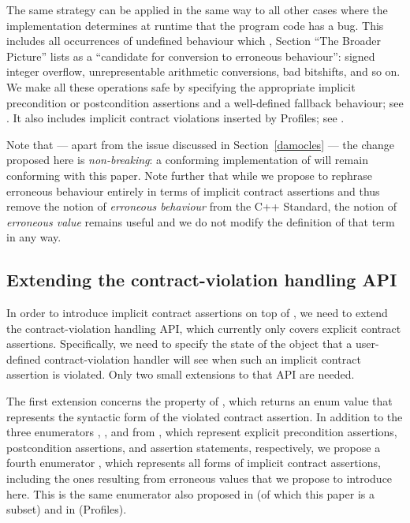 The same strategy can be applied in the same way to all other cases where the implementation determines at runtime that the program code has a bug. This includes all occurrences of undefined behaviour which \cite{P2795R5}, Section ``The Broader Picture'' lists as a ``candidate for conversion to erroneous behaviour'': signed integer overflow, unrepresentable arithmetic conversions, bad bitshifts, and so on. We make all these operations safe by specifying the appropriate implicit precondition or postcondition assertions and a well-defined fallback behaviour; see \cite{P3100R1}. It also includes implicit contract violations inserted by Profiles; see \cite{P3081R1}.

Note that --- apart from the issue discussed in Section~\ref{damocles} --- the change proposed here is \emph{non-breaking}: a conforming implementation of \cite{P2795R5} will remain conforming with this paper. Note further that while we propose to rephrase erroneous behaviour entirely in terms of implicit contract assertions and thus remove the notion of \emph{erroneous behaviour} from the C++ Standard, the notion of \emph{erroneous value} remains useful and we do not modify the definition of that term in any way.

\subsection{Extending the contract-violation handling API}

In order to introduce implicit contract assertions on top of \cite{P2900R13}, we need to extend the contract-violation handling API, which currently only covers explicit contract assertions. Specifically, we need to specify the state of the \mbox{} object that a user-defined contract-violation handler will see when such an implicit contract assertion is violated. Only two small extensions to that API are needed. 

The first extension concerns the  property of , which returns an enum value that represents the syntactic form of the violated contract assertion. In addition to the three enumerators , , and  from \cite{P2900R13}, which represent explicit precondition assertions, postcondition assertions, and assertion statements, respectively, we propose a fourth enumerator , which represents all forms of implicit contract assertions, including the ones resulting from erroneous values that we propose to introduce here. This is the same enumerator also proposed in \cite{P3100R1} (of which this paper is a subset) and in \cite{P3081R1} (Profiles).

